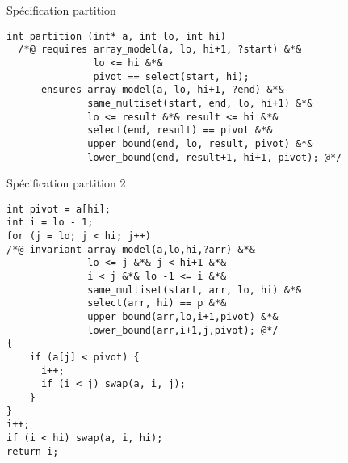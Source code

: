 \documentclass[]{beamer}
\begin{document}
\begin{frame}[fragile]{Sp\'ecification partition}
	\begin{lstlisting}[basicstyle=\footnotesize]
int partition (int* a, int lo, int hi)
  /*@ requires array_model(a, lo, hi+1, ?start) &*& 
               lo <= hi &*&
               pivot == select(start, hi);
      ensures array_model(a, lo, hi+1, ?end) &*& 
              same_multiset(start, end, lo, hi+1) &*&
              lo <= result &*& result <= hi &*&
              select(end, result) == pivot &*&
              upper_bound(end, lo, result, pivot) &*&
              lower_bound(end, result+1, hi+1, pivot); @*/
	\end{lstlisting}
	
	



	
\end{frame}







\begin{frame}[fragile]{Sp\'ecification partition 2}
	\begin{lstlisting}[basicstyle=\footnotesize]
int pivot = a[hi];
int i = lo - 1;
for (j = lo; j < hi; j++)
/*@ invariant array_model(a,lo,hi,?arr) &*&
              lo <= j &*& j < hi+1 &*& 
              i < j &*& lo -1 <= i &*& 
              same_multiset(start, arr, lo, hi) &*& 
              select(arr, hi) == p &*&
              upper_bound(arr,lo,i+1,pivot) &*& 
              lower_bound(arr,i+1,j,pivot); @*/
{
    if (a[j] < pivot) {
      i++;
      if (i < j) swap(a, i, j);
    }
}
i++;
if (i < hi) swap(a, i, hi);
return i;
	\end{lstlisting}

\end{frame}
\end{document}
